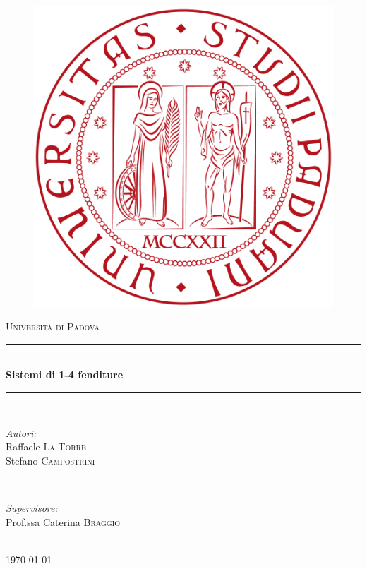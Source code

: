 \documentclass{article}
\begin{document}
\begin{titlepage}
\newcommand{\HRule}{\rule{\linewidth}{0.5mm}}
\center


\begin{figure}
\center
\includegraphics[scale=0.1]{logo}
\end{figure}


\textsc{\LARGE Università di Padova}\\[1.5cm]
\HRule \\[0.4cm]
{ \huge \bfseries Sistemi di 1-4 fenditure}\\[0.4cm]
\HRule \\[1.5cm]

\begin{minipage}{0.4\textwidth}
\begin{flushleft} \large
\emph{Autori:}\\
Raffaele \textsc{La Torre} \\
Stefano \textsc{Campostrini}
\end{flushleft}
\end{minipage}
~
\begin{minipage}{0.4\textwidth}
\begin{flushright} \large
\emph{Supervisore:} \\
Prof.ssa Caterina \textsc{Braggio}
\end{flushright}
\end{minipage}\\[4cm]

{\large \today}\\[3cm]

\vfill
\end{titlepage}
\end{document}
